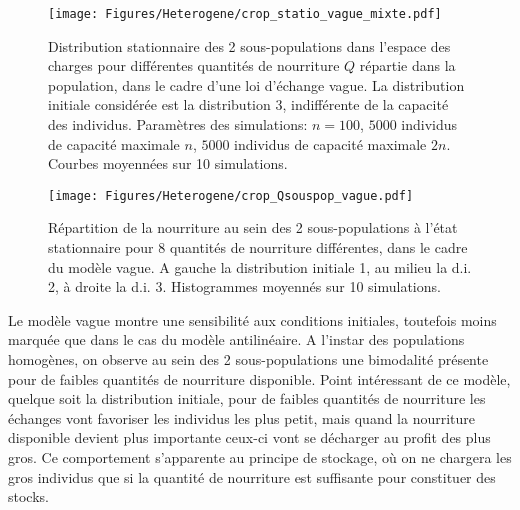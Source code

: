 \begin{figure}[h!]
\centering
\texttt{[image: Figures/Heterogene/crop\_statio\_vague\_mixte.pdf]}
\caption{Distribution stationnaire des 2 sous-populations dans l'espace des charges pour différentes quantités de nourriture $Q$ répartie dans la population, dans le cadre d'une loi d'échange vague. La distribution initiale considérée est la distribution 3, indifférente de la capacité des individus. Paramètres des simulations: $n=100$, $5000$ individus de capacité maximale $n$, $5000$ individus de capacité maximale $2n$. Courbes moyennées sur 10 simulations.}
\label{statio_vague_mixte}
\end{figure}


\begin{figure}[h!]
\centering
\texttt{[image: Figures/Heterogene/crop\_Qsouspop\_vague.pdf]}
\caption{Répartition de la nourriture au sein des 2 sous-populations à l'état stationnaire pour 8 quantités de nourriture différentes, dans le cadre du modèle vague. A gauche la distribution initiale 1, au milieu la d.i. 2, à droite la d.i. 3. Histogrammes moyennés sur 10 simulations.}
\label{Qsouspop_vague}
\end{figure}

Le modèle vague montre une sensibilité aux conditions initiales, toutefois moins marquée que dans le cas du modèle antilinéaire. A l'instar des populations homogènes, on observe au sein des 2 sous-populations une bimodalité présente pour de faibles quantités de nourriture disponible. Point intéressant de ce modèle, quelque soit la distribution initiale, pour de faibles quantités de nourriture les échanges vont favoriser les individus les plus petit, mais quand la nourriture disponible devient plus importante ceux-ci vont se décharger au profit des plus gros. Ce comportement s'apparente au principe de stockage, où on ne chargera les gros individus que si la quantité de nourriture est suffisante pour constituer des stocks.